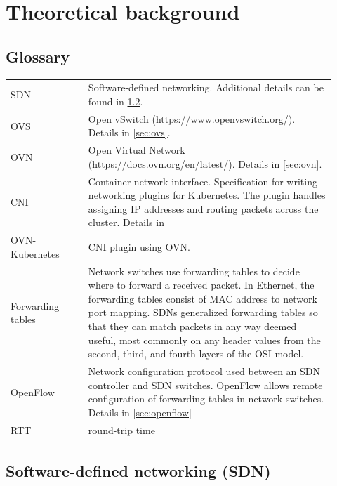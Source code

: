 \chapter{Theoretical background}
\label{chap:refs}

\section{Glossary}

\begin{tabular}{p{0.22\linewidth}p{0.7\linewidth}}
    SDN & Software-defined networking. Additional details can be found in \cref{sec:sdn}. \\ %

    OVS & Open vSwitch (\url{https://www.openvswitch.org/}). Details in \cref{sec:ovs}. \\ %

    OVN & Open Virtual Network (\url{https://docs.ovn.org/en/latest/}). Details in \cref{sec:ovn}. \\ %

    CNI & Container network interface\tablefootnote{\url{https://github.com/containernetworking/cni/blob/dc0779e8cec8bfe39bc0d7a038250e233e5214eb/SPEC.md}}. Specification for writing networking plugins for Kubernetes. The plugin handles assigning IP addresses and routing packets across the cluster. Details in \\

    OVN-Kubernetes & CNI plugin using OVN. \\

    Forwarding tables & Network switches use forwarding tables to decide where to forward a received packet. In Ethernet, the forwarding tables consist of MAC address to network port mapping. SDNs generalized forwarding tables so that they can match packets in any way deemed useful, most commonly on any header values from the second, third, and fourth layers of the OSI model. \\

    OpenFlow & Network configuration protocol used between an SDN controller and SDN switches. OpenFlow allows remote configuration of forwarding tables in network switches. Details in \cref{sec:openflow} \\

    RTT & round-trip time  \\

\end{tabular}

\section{Software-defined networking (SDN)}
\label{sec:sdn}


